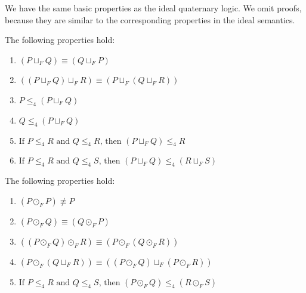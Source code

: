 \documentclass{llncs}
\begin{document}
We have the same basic properties as the ideal quaternary logic.  We
omit proofs, because they are similar to the corresponding properties
in the ideal semantics.
\begin{lemma}
  \label{lemma:basic_properties_for_choice}
  The following properties hold:
  \begin{enumerate}
  \item $(P \sqcup_F Q) \equiv (Q \sqcup_F P)$\\[-5px]
  \item $((P \sqcup_F Q) \sqcup_F R) \equiv (P \sqcup_F (Q \sqcup_F R))$\\[-5px]
  \item $P \leq_4 (P \sqcup_F Q)$\\[-5px]
  \item $Q \leq_4 (P \sqcup_F Q)$\\[-5px]
  \item $\text{If }P \leq_4 R \text{ and } Q \leq_4 R \text{, then } (P \sqcup_F Q) \leq_4 R$\\[-5px]
  \item $\text{If }P \leq_4 R \text{ and } Q \leq_4 S \text{, then } (P \sqcup_F Q) \leq_4 (R \sqcup_F S)$
  \end{enumerate}
\end{lemma}

\begin{lemma}
  \label{lemma:basic_properties_for_parallel}
  The following properties hold:
  \begin{enumerate}
  \item $(P \odot_F P) \not\equiv P$\\[-5px]
  \item $(P \odot_F Q) \equiv (Q \odot_F P)$\\[-5px]
  \item $((P \odot_F Q) \odot_F R) \equiv (P \odot_F (Q \odot_F R))$\\[-5px]
  \item $(P \odot_F (Q \sqcup_F R)) \equiv ((P \odot_F Q) \sqcup_F (P \odot_F R))$\\[-5px]
  \item $\text{If }P \leq_4 R \text{ and } Q \leq_4 S \text{, then } (P \odot_F Q) \leq_4 (R \odot_F S)$
  \end{enumerate}
\end{lemma}
\end{document}
